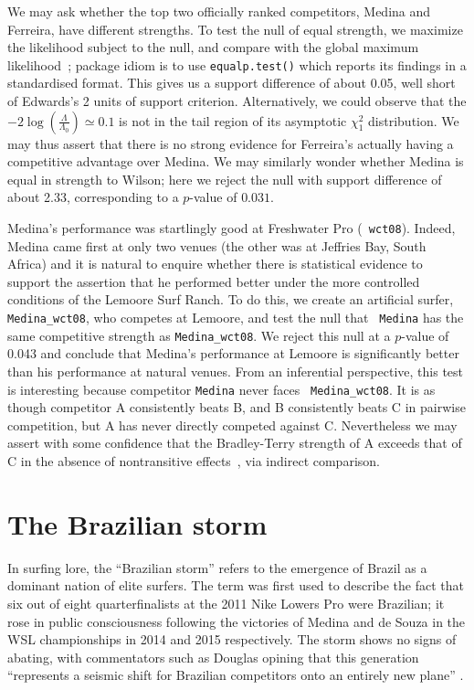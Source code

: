 \documentclass{article}
\begin{document}
We may ask whether the top two officially ranked competitors, Medina
and Ferreira, have different strengths.  To test the null of equal
strength, we maximize the likelihood subject to the null, and compare
with the global maximum likelihood~\citep{hankin2010}; package idiom
is to use {\tt equalp.test()} which reports its findings in a
standardised format.  This gives us a support difference of about
0.05, well short of Edwards's 2 units of support criterion.
Alternatively, we could observe that the
$-2\log\left(\frac{\Lambda}{\Lambda_0}\right)\simeq 0.1$ is not in the
tail region of its asymptotic $\chi^2_1$ distribution.  We may thus
assert that there is no strong evidence for Ferreira's actually having
a competitive advantage over Medina.  We may similarly wonder whether
Medina is equal in strength to Wilson; here we reject the null with
support difference of about 2.33, corresponding to a $p$-value of
$0.031$.

Medina's performance was startlingly good at Freshwater Pro ({\tt
  wct08}).  Indeed, Medina came first at only two venues (the other
was at Jeffries Bay, South Africa) and it is natural to enquire
whether there is statistical evidence to support the assertion that he
performed better under the more controlled conditions of the Lemoore
Surf Ranch.  To do this, we create an artificial surfer, {\tt
  Medina\_wct08}, who competes at Lemoore, and test the null that {\tt
  Medina} has the same competitive strength as {\tt Medina\_wct08}.
We reject this null at a $p$-value of 0.043 and conclude that Medina's
performance at Lemoore is significantly better than his performance at
natural venues.  From an inferential perspective, this test is
interesting because competitor {\tt Medina} never faces {\tt
  Medina\_wct08}.  It is as though competitor A consistently beats B,
and B consistently beats C in pairwise competition, but A has never
directly competed against C.  Nevertheless we may assert with some
confidence that the Bradley-Terry strength of A exceeds that of C in
the absence of nontransitive effects~\citep{west2008}, via indirect
comparison.

\section{The Brazilian storm}

In surfing lore, the ``Brazilian storm'' refers to the emergence of
Brazil as a dominant nation of elite surfers.  The term was first used
to describe the fact that six out of eight quarterfinalists at the 2011 Nike
Lowers Pro were Brazilian; it rose in public consciousness following
the victories of Medina and de Souza in the WSL
championships in 2014 and 2015 respectively.  The storm shows no signs
of abating, with commentators such as Douglas opining that this
generation ``represents a seismic shift for Brazilian competitors onto
an entirely new plane'' \citep{douglas2020}.
\end{document}

